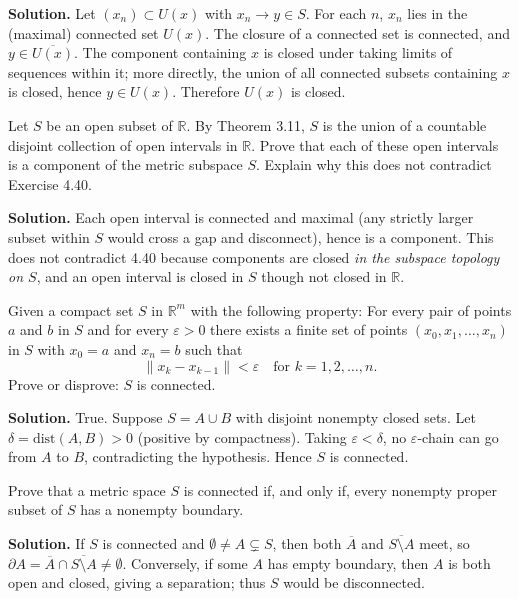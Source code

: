 \noindent\textbf{Solution.}
Let $(x_n)\subset U(x)$ with $x_n\to y\in S$. For each $n$, $x_n$ lies in the (maximal) connected set $U(x)$. The closure of a connected set is connected, and $y\in\overline{U(x)}$. The component containing $x$ is closed under taking limits of sequences within it; more directly, the union of all connected subsets containing $x$ is closed, hence $y\in U(x)$. Therefore $U(x)$ is closed.
\medskip

\begin{problembox}
Let $S$ be an open subset of $\mathbb{R}$. By Theorem 3.11, $S$ is the union of a countable disjoint collection of open intervals in $\mathbb{R}$. Prove that each of these open intervals is a component of the metric subspace $S$. Explain why this does not contradict Exercise 4.40.
\end{problembox}

\noindent\textbf{Solution.}
Each open interval is connected and maximal (any strictly larger subset within $S$ would cross a gap and disconnect), hence is a component. This does not contradict 4.40 because components are closed \emph{in the subspace topology on $S$}, and an open interval is closed in $S$ though not closed in $\mathbb{R}$.
\medskip

\begin{problembox}
Given a compact set $S$ in $\mathbb{R}^m$ with the following property: For every pair of points $a$ and $b$ in $S$ and for every $\varepsilon > 0$ there exists a finite set of points $(x_0, x_1, \ldots, x_n)$ in $S$ with $x_0 = a$ and $x_n = b$ such that
\[\|x_k - x_{k-1}\| < \varepsilon \quad \text{for } k = 1, 2, \ldots, n.\]
Prove or disprove: $S$ is connected.
\end{problembox}

\noindent\textbf{Solution.}
True. Suppose $S=A\cup B$ with disjoint nonempty closed sets. Let $\delta=\mathrm{dist}(A,B)>0$ (positive by compactness). Taking $\varepsilon<\delta$, no $\varepsilon$-chain can go from $A$ to $B$, contradicting the hypothesis. Hence $S$ is connected.
\medskip

\begin{problembox}
Prove that a metric space $S$ is connected if, and only if, every nonempty proper subset of $S$ has a nonempty boundary.
\end{problembox}

\noindent\textbf{Solution.}
If $S$ is connected and $\emptyset\ne A\subsetneq S$, then both $\overline{A}$ and $\overline{S\setminus A}$ meet, so $\partial A=\overline{A}\cap\overline{S\setminus A}\ne\emptyset$. Conversely, if some $A$ has empty boundary, then $A$ is both open and closed, giving a separation; thus $S$ would be disconnected.
\medskip

